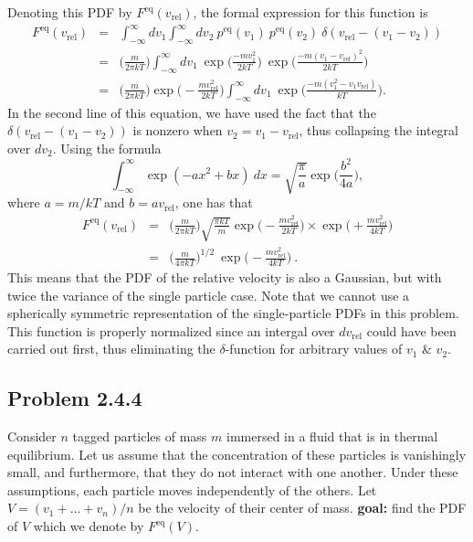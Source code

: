 Denoting this PDF by $F^\text{eq}(v_\text{rel})$, the formal expression for this function is
\begin{eqnarray}
F^\text{eq}(v_\text{rel}) &=& \int_{-\infty}^{\infty} dv_1 \int_{-\infty}^{\infty} dv_2 ~ p^\text{eq}(v_1) ~ p^\text{eq}(v_2) ~ \delta(v_\text{rel} - (v_1-v_2)) \nonumber \\
&=& \bigg( \frac{m}{2\pi k T}\bigg) \int_{-\infty}^{\infty} dv_1 ~ \exp\bigg(\frac{-m v_1^2}{2 k T}\bigg)~\exp\bigg(\frac{-m (v_1-v_\text{rel})^2}{2 k T}\bigg) \nonumber \\
&=& \bigg( \frac{m}{2\pi k T}\bigg) \exp\bigg(-\frac{m v_\text{rel}^2}{2 k T}\bigg) \int_{-\infty}^{\infty} dv_1 ~\exp\bigg(\frac{-m (v_1^2-v_1 v_\text{rel})}{k T}\bigg). \nonumber
\end{eqnarray}
In the second line of this equation, we have used the fact that the $\delta(v_\text{rel} - (v_1-v_2))$ is nonzero when $v_2=v_1-v_\text{rel}$, thus collapsing the integral over $dv_2$.
Using the formula
\begin{equation}
\int_{-\infty}^{\infty} \exp(-a x^2 + bx)~dx = \sqrt{\frac{\pi}{a}} \exp\bigg(\frac{b^2}{4a}\bigg), \nonumber
\end{equation}
where $a=m/k T$ and $b = a v_\text{rel}$, one has that
\begin{eqnarray}
F^\text{eq}(v_\text{rel}) &=& \bigg( \frac{m}{2\pi k T}\bigg) \sqrt{\frac{\pi k T}{m}} \exp\bigg(-\frac{m v_\text{rel}^2}{2 k T}\bigg) \times \exp\bigg(+\frac{m v_\text{rel}^2}{4 k T}\bigg) \nonumber \\
&=& \boxed{\bigg( \frac{m}{4\pi k T}\bigg)^{1/2} ~ \exp\bigg(-\frac{m v_\text{rel}^2}{4 k T}\bigg)}~.
\end{eqnarray}
This means that the PDF of the relative velocity is also a Gaussian, but with twice the variance of the single particle case. Note that we cannot use a spherically symmetric representation of the single-particle PDFs in this problem. This function is properly normalized since an intergal over $d v_\text{rel}$ could have been carried out first, thus eliminating the $\delta$-function for arbitrary values of $v_1$ \& $v_2$.


\subsection{Problem 2.4.4}

Consider $n$ tagged particles of mass $m$ immersed in a fluid that is in thermal equilibrium. Let us assume that the concentration of these particles is vanishingly small, and furthermore, that they do not interact with one another. Under these assumptions, each particle moves independently of the others. Let $V = (v_1 + \ldots + v_n)/n$ be the velocity of their center of mass. \textbf{goal:} find the PDF of $V$ which we denote by $F^\text{eq}(V)$.

